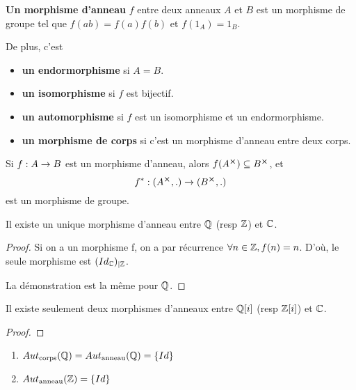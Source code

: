 \begin{definition}
	\textbf{Un morphisme d'anneau} $f$ entre deux anneaux $A$ et $B$ est un
	morphisme de groupe tel que $f(ab) = f(a) f(b)$ et $f(1_{A}) = 1_{B}$.

	De plus, c'est
	\begin{itemize}
		\item \textbf{un endormorphisme} si $A = B$.
		\item \textbf{un isomorphisme} si $f$ est bijectif.
		\item \textbf{un automorphisme} si $f$ est un isomorphisme et un
			endormorphisme.
		\item \textbf{un morphisme de corps} si c'est un morphisme d'anneau entre deux corps.
	\end{itemize}
\end{definition}

\begin{remarque}
	Si $f : A \rightarrow B$ est un morphisme d'anneau, alors $f(A^{\cross})
	\subseteq B^{\cross}$, et
	\begin{equation}
		f^{*} : (A^{\cross}, .) \rightarrow (B^{\cross}, .)
	\end{equation}
	est un morphisme de groupe.
\end{remarque}

\begin{proposition}
	Il existe un unique morphisme d'anneau entre $\mathbb{Q}$ (resp $\mathbb{Z}$)
	et $\mathbb{C}$.
\end{proposition}

\ifdefined\outputproof
\begin{proof}
	Si on a un morphisme f, on a par récurrence $\forall n \in \mathbb{Z}, f(n) =
	n$. D'où, le seule morphisme est $({Id_{\mathbb{C}}})_{|\mathbb{Z}}$.

	La démonstration est la même pour $\mathbb{Q}$.
\end{proof}
\fi

\begin{proposition}
	Il existe seulement deux morphismes d'anneaux entre $\mathbb{Q}[i]$ (resp
	$\mathbb{Z}[i]$) et $\mathbb{C}$.
\end{proposition}

\ifdefined\outputproof
\begin{proof}

\end{proof}
\fi

\begin{corollary}
	\begin{enumerate}
		\item $Aut_{\text{corps}}(\mathbb{Q}) =
			Aut_{\text{anneau}}(\mathbb{Q}) = \left\{ Id \right\}$
		\item $Aut_{\text{anneau}}(\mathbb{Z}) = \left\{ Id \right\}$
	\end{enumerate}
\end{corollary}


